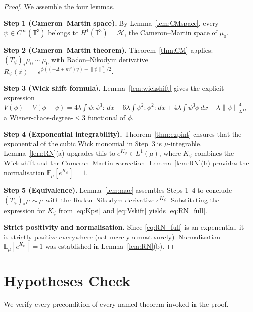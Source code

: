 \documentclass[11pt,a4paper]{article}
\theoremstyle{definition}
\newcommand{\T}{\mathbb{T}}
\newcommand{\E}{\mathbb{E}}
\newcommand{\Hc}{\mathcal{H}}
\newcommand{\norm}[1]{\left\|#1\right\|}
\newcommand{\wick}[1]{:\!#1\!:}
\begin{document}
\begin{proof}
We assemble the four lemmas.

\medskip
\noindent\textbf{Step 1 (Cameron--Martin space).}
By Lemma~\ref{lem:CMspace}, every $\psi\in C^\infty(\T^3)$ belongs to $H^1(\T^3) = \Hc$, the Cameron--Martin space of $\mu_0$.

\medskip
\noindent\textbf{Step 2 (Cameron--Martin theorem).}
Theorem~\ref{thm:CM} applies: $(T_\psi)_*\mu_0\sim\mu_0$ with Radon--Nikodym derivative $R_\psi(\phi) = e^{\phi((-\Delta+m^2)\psi)-\norm{\psi}_\Hc^2/2}$.

\medskip
\noindent\textbf{Step 3 (Wick shift formula).}
Lemma~\ref{lem:wickshift} gives the explicit expression $V(\phi)-V(\phi-\psi) = 4\lambda\int\psi\wick{\phi^3}\,dx - 6\lambda\int\psi^2\wick{\phi^2}\,dx + 4\lambda\int\psi^3\phi\,dx - \lambda\norm{\psi}_{L^4}^4$, a Wiener-chaos-degree-$\le 3$ functional of $\phi$.

\medskip
\noindent\textbf{Step 4 (Exponential integrability).}
Theorem~\ref{thm:expint} ensures that the exponential of the cubic Wick monomial in Step~3 is $\mu$-integrable.
Lemma~\ref{lem:RN}(a) upgrades this to $e^{K_\psi}\in L^1(\mu)$, where $K_\psi$ combines the Wick shift and the Cameron--Martin correction.
Lemma~\ref{lem:RN}(b) provides the normalisation $\E_\mu[e^{K_\psi}]=1$.

\medskip
\noindent\textbf{Step 5 (Equivalence).}
Lemma~\ref{lem:mac} assembles Steps 1--4 to conclude $(T_\psi)_*\mu\sim\mu$ with the Radon--Nikodym derivative $e^{K_\psi}$.
Substituting the expression for $K_\psi$ from \eqref{eq:Kpsi} and \eqref{eq:Vshift} yields \eqref{eq:RN_full}.

\medskip
\noindent\textbf{Strict positivity and normalisation.}
Since \eqref{eq:RN_full} is an exponential, it is strictly positive everywhere (not merely almost surely).
Normalisation $\E_\mu[e^{K_\psi}]=1$ was established in Lemma~\ref{lem:RN}(b).
\end{proof}

\section{Hypotheses Check}

We verify every precondition of every named theorem invoked in the proof.
\end{document}
